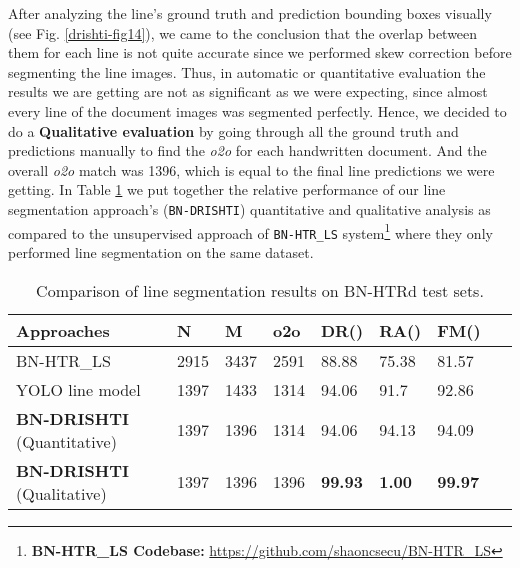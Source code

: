\documentclass[runningheads]{llncs}
\begin{document}
\noindent After analyzing the line’s ground truth and prediction bounding boxes visually (see Fig. \ref{drishti-fig14}), we came to the conclusion that the overlap between them for each line is not quite accurate since we performed skew correction before segmenting the line images. Thus, in automatic or quantitative evaluation the results we are getting are not as significant as we were expecting, since almost every line of the document images was segmented perfectly. Hence, we decided to do a \textbf{Qualitative evaluation} by going through all the ground truth and predictions manually to find the \textit{o2o} for each handwritten document. And the overall \textit{o2o} match was 1396, which is equal to the final line predictions we were getting. In Table \ref{drishti-tab4} we put together the relative performance of our line segmentation approach’s (\texttt{BN-DRISHTI}) quantitative and qualitative analysis as compared to the unsupervised approach of \texttt{BN-HTR\_LS} system\footnote{\textbf{BN-HTR\_LS Codebase:} \url{https://github.com/shaoncsecu/BN-HTR\_LS}} \cite{rahman2023bn} where they only performed line segmentation on the same dataset.

\begin{table}
\vspace{-4mm}
\centering
\caption{Comparison of line segmentation results on BN-HTRd test sets.}\label{drishti-tab4}
\begin{tabular}{|p{0.4\linewidth}|p{0.08\linewidth}|p{0.08\linewidth}|p{0.08\linewidth}|p{0.1\linewidth}|p{0.1\linewidth}|p{0.1\linewidth}|p{0.1\linewidth}|}
\hline
\textbf{Approaches} & \textbf{N}	&  \textbf{M} & \textbf{o2o} & \textbf{DR()} & \textbf{RA()} & \textbf{FM()} \\
\hline
BN-HTR\_LS \cite{rahman2023bn} & 2915 & 3437 & 2591 & 88.88 & 75.38 & 81.57 \\
\hline
YOLO line model & 1397 & 1433 & 1314 & 94.06 & 91.7 & 92.86 \\
\hline
\textbf{BN-DRISHTI} (Quantitative) & 1397 & 1396 & 1314 & 94.06 & 94.13 & 94.09 \\
\hline
\textbf{BN-DRISHTI} (Qualitative) & 1397 & 1396 & 1396 & \textbf{99.93} & \textbf{1.00} & \textbf{99.97} \\
\hline
\end{tabular}
\vspace{-10mm}
\end{table}
\end{document}

